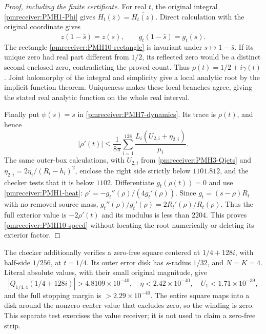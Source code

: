 \documentclass[11pt]{article}
\begin{document}
\begin{proof}[Proof, including the finite certificate]
For real $t$, the original integral \eqref{pmreceiver:PMH1-Phi} gives
$H_t(\bar z)=\overline{H_t(z)}$. Direct calculation with the
original coordinate gives
\[
 z(1-\bar s)=\overline{z(s)},\qquad
 g_t(1-\bar s)=\overline{g_t(s)}.
\]
The rectangle \eqref{pmreceiver:PMH10-rectangle} is invariant under
$s\mapsto1-\bar s$. If its unique zero had real part different
from $1/2$, its reflected zero would be a distinct second enclosed
zero, contradicting the proved count. Thus
$\rho(t)=1/2+i\gamma(t)$. Joint holomorphy of the integral and
simplicity give a local analytic root by the implicit function
theorem. Uniqueness makes these local branches agree, giving the
stated real analytic function on the whole real interval.

Finally put $\psi(s)=s$ in \eqref{pmreceiver:PMH7-dynamics}. Its trace is
$\rho(t)$, and hence
\begin{equation}\label{pmreceiver:PMH10-velocity-certificate}
 |\rho'(t)|\le\frac1{8\pi}\sum_{i=1}^{128}
        \frac{L_i(U_{2,i}+\eta_{2,i})}{\mu_i}.
\end{equation}
The same outer-box calculations, with $U_{2,i}$ from
\eqref{pmreceiver:PMH3-Qjets} and
$\eta_{2,i}=2\eta_i/(R_i-h_i)^2$, enclose the right side strictly
below $1101.812$, and the checker tests that it is below $1102$.
Differentiate $g_t(\rho(t))=0$ and use
\eqref{pmreceiver:PMH1-heat}: $\rho'=-g_t''(\rho)/(4g_t'(\rho))$.
Since $g_t=(s-\rho)R_t$ with no removed source mass,
$g_t''(\rho)/g_t'(\rho)=2R_t'(\rho)/R_t(\rho)$.
Thus the full exterior value is $-2\rho'(t)$ and its modulus is
less than $2204$. This proves \eqref{pmreceiver:PMH10-speed} without locating
the root numerically or deleting its exterior factor.
\end{proof}

The checker additionally verifies a zero-free square centered at
$1/4+128i$, with half-side $1/256$, at $t=1/4$. Its outer error disk
has $s$-radius $1/32$, and $N=K=4$. Literal absolute values, with
their small original magnitude, give
\[
 |Q_{1/4,4}(1/4+128i)|>4.8109\times10^{-40},\quad
 \eta<2.42\times10^{-40},\quad U_1<1.71\times10^{-39},
\]
and the full stopping margin is $>2.29\times10^{-40}$.
The entire square maps into a disk around the nonzero center
value that excludes zero, so the winding is zero. This separate
test exercises the value receiver; it is not used to claim a
zero-free strip.
\end{document}
